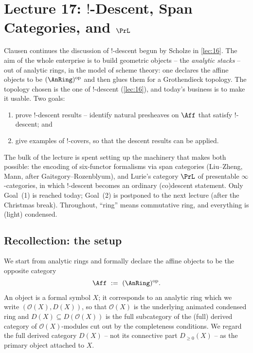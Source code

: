 \section{Lecture 17: \texorpdfstring{$!$}{!}-Descent, Span Categories, and \texorpdfstring{$\PrL$}{PrL}}
\label{lec:17}

Clausen continues the discussion of $!$-descent begun by Scholze in \cref{lec:16}.
The aim of the whole enterprise is to build geometric objects -- the
\emph{analytic stacks} -- out of analytic rings, in the model of scheme theory:
one declares the affine objects to be $(\AnRing)^{\mathrm{op}}$ and then glues them
for a Grothendieck topology. The topology chosen is the one of $!$-descent
(\cref{lec:16}), and today's business is to make it usable. Two goals:
\begin{enumerate}
\item prove $!$-descent results -- identify natural presheaves on
$\Aff$ that satisfy $!$-descent; and
\item give examples of $!$-covers, so that the descent results can be applied.
\end{enumerate}
The bulk of the lecture is spent setting up the machinery that makes both possible:
the encoding of six-functor formalisms via span categories (Liu--Zheng, Mann,
after Gaitsgory--Rozenblyum), and Lurie's category $\PrL$ of presentable
$\infty$-categories, in which $!$-descent becomes an ordinary (co)descent statement.
Only Goal~(1) is reached today; Goal~(2) is postponed to the next lecture (after the
Christmas break). Throughout, ``ring'' means commutative ring, and everything is
(light) condensed.

\subsection{Recollection: the setup}
\label{subsec:17:recollection}

We start from analytic rings and formally declare the affine objects to be the
opposite category
\begin{equation*}
\Aff\ :=\ (\AnRing)^{\mathrm{op}}.
\end{equation*}
An object is a formal symbol $X$; it corresponds to an analytic ring which we write
$(\mathcal O(X), D(X))$, so that $\mathcal O(X)$ is the underlying animated condensed
ring and $D(X)\subseteq D(\mathcal O(X))$ is the full subcategory of the (full) derived
category of $\mathcal O(X)$-modules cut out by the completeness conditions. We regard
the full derived category $D(X)$ -- not its connective part $D_{\ge0}(X)$ -- as the
primary object attached to $X$.

